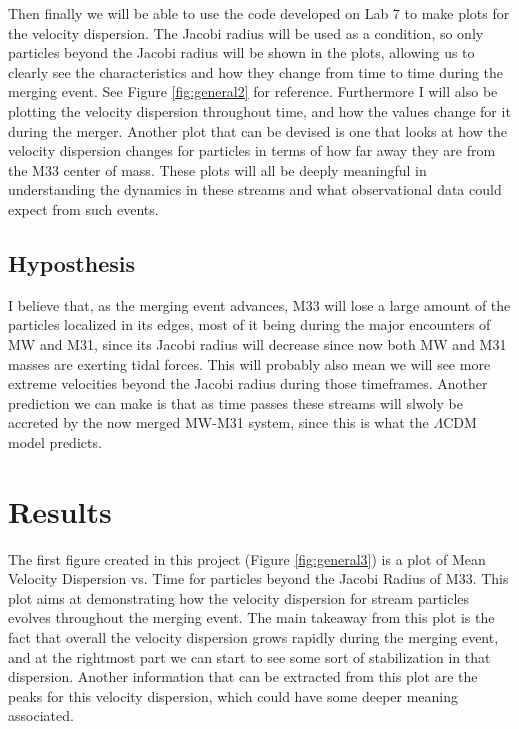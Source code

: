 \documentclass[linenumbers,trackchanges]{aastex7}
\begin{document}
Then finally we will be able to use the code developed on Lab 7 to make plots for the velocity dispersion. The Jacobi radius will be used as a condition, so only particles beyond the Jacobi radius will be shown in the plots, allowing us to clearly see the characteristics and how they change from time to time during the merging event. See Figure \ref{fig:general2} for reference. Furthermore I will also be plotting the velocity dispersion throughout time, and how the values change for it during the merger. Another plot that can be devised is one that looks at how the velocity dispersion changes for particles in terms of how far away they are from the M33 center of mass. These plots will all be deeply meaningful in understanding the dynamics in these streams and what observational data could expect from such events.

\begin{figure*}[h!]
\caption{Diagram illustrating the steps that need to be taken in order to obtain velocity dispersion and gradient plots of particles located beyond the Jacobi radius (No longer bound by M33). In blue we can see more detailed explanations for how each function developed during an assignment will be used.
\label{fig:general2}}
\end{figure*}


\subsection{Hyposthesis}

I believe that, as the merging event advances, M33 will lose a large amount of the particles localized in its edges, most of it being during the major encounters of MW and M31, since its Jacobi radius will decrease since now both MW and M31 masses are exerting tidal forces. This will probably also mean we will see more extreme velocities beyond the Jacobi radius during those timeframes. Another prediction we can make is that as time passes these streams will slwoly be accreted by the now merged MW-M31 system, since this is what the $\Lambda$CDM model predicts.

\section{Results} \label{sec:results}

The first figure created in this project (Figure \ref{fig:general3}) is a plot of Mean Velocity Dispersion vs. Time for particles beyond the Jacobi Radius of M33. This plot aims at demonstrating how the velocity dispersion for stream particles evolves throughout the merging event. The main takeaway from this plot is the fact that overall the velocity dispersion grows rapidly during the merging event, and at the rightmost part we can start to see some sort of stabilization in that dispersion. Another information that can be extracted from this plot are the peaks for this velocity dispersion, which could have some deeper meaning associated.
\end{document}
